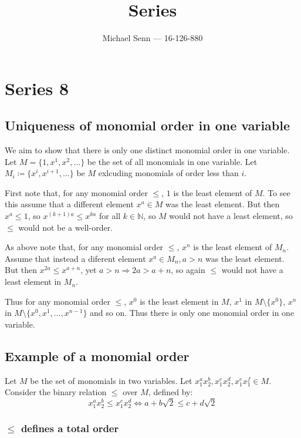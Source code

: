 \documentclass[a4paper]{scrreprt}
\title{Series \series}
\author{Michael Senn \maillink{michael.senn@students.unibe.ch} --- 16-126-880}
\date{\printdate}
\newcommand{\series}{8}
\begin{document}
\maketitle


\setcounter{chapter}{\numexpr \series - 1 \relax}

\chapter{Series \series}

\section{Uniqueness of monomial order in one variable}

We aim to show that there is only one distinct monomial order in one
variable. Let $M = \{1, x^1, x^2, \ldots\}$ be the set of all monomials in one
variable. Let $M_i \coloneqq \{x^i, x^{i+1}, \ldots \}$ be $M$ exlcuding
monomials of order less than $i$.

First note that, for any monomial order $\leq$, $1$ is the least element of
$M$. To see this assume that a different element $x^a \in M$ was the least
element. But then $x^a \leq 1$, so $x^{(k+1)a} \leq x^{ka}$ for all $k \in
\mathbb{N}$, so $M$ would not have a least element, so $\leq$ would not be a
well-order.

As above note that, for any monomial order $\leq$, $x^n$ is the least element
of $M_n$. Assume that instead a diferent element $x^a \in M_n, a > n$ was the
least element. But then $x^{2a} \leq x^{a + n}$, yet $a > n \Rightarrow 2a >
a+n$, so again $\leq$ would not have a least element in $M_n$.

Thus for any monomial order $\leq$, $x^0$ is the least element in $M$, $x^1$
in $M \setminus\{x^0\}$, $x^n$ in $M \setminus \{x^0, x^1, \ldots, x^{n-1}\}$ and
so on. Thus there is only one monomial order in one variable.

\section{Example of a monomial order}

Let $M$ be the set of monomials in two variables. Let $x_1^a x_2^b, x_1^c
x_2^d, x_1^e x_1^f \in M$. Consider the binary relation $\leq$ over $M$,
defined by:
\[
		x_1^a x_2^b \leq x_1^c x_2^d \Leftrightarrow a + b \sqrt{2} \leq c + d \sqrt{2}
\]

\subsection{$\leq$ defines a total order}
\end{document}
